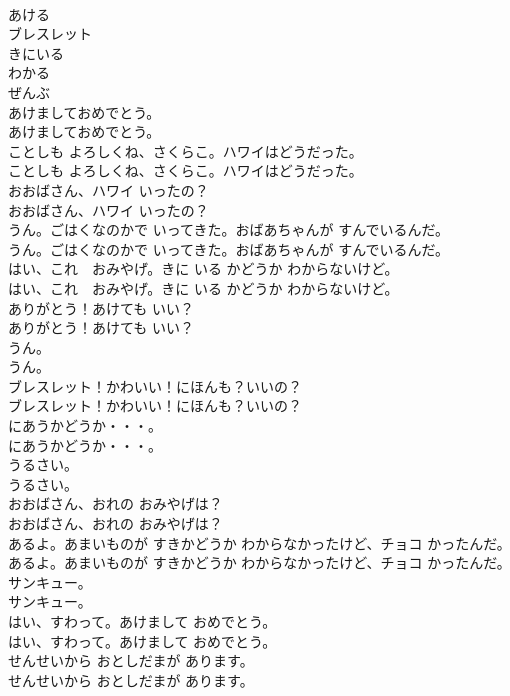 \documentclass[8pt]{extreport}
\begin{document}
\begin{CJK}{UTF8}{min}
\\	あける
\\	ブレスレット
\\	きにいる
\\	わかる
\\	ぜんぶ
\\	あけましておめでとう。	
\\	あけましておめでとう。 
\\	ことしも よろしくね、さくらこ。ハワイはどうだった。	
\\	ことしも よろしくね、さくらこ。ハワイはどうだった。 
\\	おおばさん、ハワイ いったの？	
\\	おおばさん、ハワイ いったの？ 
\\	うん。ごはくなのかで いってきた。おばあちゃんが すんでいるんだ。	
\\	うん。ごはくなのかで いってきた。おばあちゃんが すんでいるんだ。 
\\	はい、これ　おみやげ。きに いる かどうか わからないけど。	
\\	はい、これ　おみやげ。きに いる かどうか わからないけど。 
\\	ありがとう！あけても いい？	
\\	ありがとう！あけても いい？ 
\\	うん。	
\\	うん。 
\\	ブレスレット！かわいい！にほんも？いいの？	
\\	ブレスレット！かわいい！にほんも？いいの？ 
\\	にあうかどうか・・・。	
\\	にあうかどうか・・・。 
\\	うるさい。	
\\	うるさい。 
\\	おおばさん、おれの おみやげは？	
\\	おおばさん、おれの おみやげは？ 
\\	あるよ。あまいものが すきかどうか わからなかったけど、チョコ かったんだ。	
\\	あるよ。あまいものが すきかどうか わからなかったけど、チョコ かったんだ。 
\\	サンキュー。	
\\	サンキュー。 
\\	はい、すわって。あけまして おめでとう。	
\\	はい、すわって。あけまして おめでとう。 
\\	せんせいから おとしだまが あります。	
\\	せんせいから おとしだまが あります。 

\end{CJK}
\end{document}

